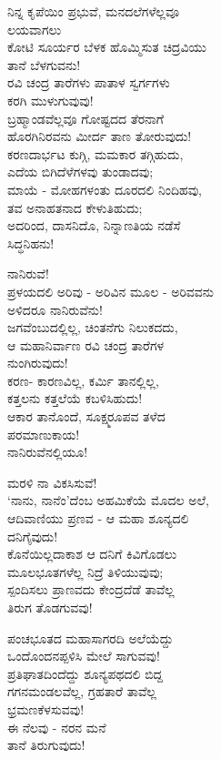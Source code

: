 ನಿನ್ನ ಕೃಪೆಯಿಂ ಪ್ರಭುವೆ, ಮನದಲೆಗಳೆಲ್ಲವೂ\\ಲಯವಾಗಲು\\ಕೋಟಿ ಸೂರ್ಯರ ಬೆಳಕ ಹೊಮ್ಮಿಸುತ ಚಿದ್ರವಿಯು\\ತಾನೆ ಬೆಳಗುವನು!\\ರವಿ ಚಂದ್ರ ತಾರೆಗಳು ಪಾತಾಳ ಸ್ವರ್ಗಗಳು\\ಕರಗಿ ಮುಳುಗುವುವು!\\ಬ್ರಹ್ಮಾಂಡವೆಲ್ಲವೂ ಗೋಷ್ಟದದ ತೆರನಾಗೆ\\ಹೊರಗಿನಿರವನು ಮೀರ್ದ ತಾಣ ತೋರುವುದು!\\
 ಕರಣದಾರ್ಭಟ ಕುಗ್ಗಿ, ಮಮಕಾರ ತಗ್ಗಿಹುದು,\\ಎದೆಯ ಬಿಗಿದೆಳೆಗಳವು ತುಂಡಾದವು;\\ಮಾಯೆ - ಮೋಹಗಳಂತು ದೂರದಲಿ ನಿಂದಿಹವು,\\ತವ ಅನಾಹತನಾದ ಕೇಳುತಿಹುದು;\\ಅದರಿಂದ, ದಾಸನಿದೊ, ನಿನ್ನಾಣತಿಯ ನಡೆಸೆ\\ಸಿದ್ಧನಿಹನು!

ನಾನಿರುವೆ!\\ಪ್ರಳಯದಲಿ ಅರಿವು - ಅರಿವಿನ ಮೂಲ - ಅರಿವವನು\\ಅಳಿದರೂ ನಾನಿರುವೆನು!\\ಜಗವೆಂಬುದಲ್ಲಿಲ್ಲ, ಚಿಂತನೆಗು ನಿಲುಕದದು,\\ಆ ಮಹಾನಿರ್ವಾಣ ರವಿ ಚಂದ್ರ ತಾರೆಗಳ\\ನುಂಗಿರುವುದು!\\ಕರಣ- ಕಾರಣವಿಲ್ಲ, ಕರ್ಮಿ ತಾನಲ್ಲಿಲ್ಲ,\\ಕತ್ತಲನು ಕತ್ತಲೆಯೆ ಕಬಳಿಸಿಹುದು!\\ಆಕಾರ ತಾನೊಂದೆ, ಸೂಕ್ಷ್ಮರೂಪವ ತಳೆದ\\ಪರಮಾಣುಕಾಯ!\\ನಾನಿರುವೆನಲ್ಲಿಯೂ!

ಮರಳಿ ನಾ ವಿಕಸಿಸುವೆ!\\‘ನಾನು, ನಾನೆಂ’ದೆಂಬ ಅಹಮಿಕೆಯೆ ಮೊದಲ ಅಲೆ,\\ಆದಿವಾಣಿಯು ಪ್ರಣವ - ಆ ಮಹಾ ಶೂನ್ಯದಲಿ\\ದನಿಗೈವುದು!\\ಕೊನೆಯಿಲ್ಲದಾಕಾಶ ಆ ದನಿಗೆ ಕಿವಿಗೊಡಲು\\ಮೂಲಭೂತಗಳೆಲ್ಲ ನಿದ್ರೆ ತಿಳಿಯುವುವು;\\ಸ್ಪಂದಿಸಲು ಪ್ರಾಣವದು ಕೇಂದ್ರದೆಡೆ ತಾವೆಲ್ಲ\\ತಿರುಗ ತೊಡಗುವವು!

ಪಂಚಭೂತದ ಮಹಾಸಾಗರದಿ ಅಲೆಯೆದ್ದು\\ಒಂದೊಂದನಪ್ಪಳಿಸಿ ಮೇಲೆ ಸಾಗುವವು!\\ಪ್ರತಿಘಾತದಿಂದೆದ್ದು ಶೂನ್ಯಪಥದಲಿ ಬಿದ್ದ\\ಗಗನಮಂಡಲವೆಲ್ಲ, ಗ್ರಹತಾರೆ ತಾವೆಲ್ಲ\\ಭ್ರಮಣಕೆಳಸುವವು!\\ಈ ನೆಲವು - ನರನ ಮನೆ\\ತಾನೆ ತಿರುಗುವುದು!

